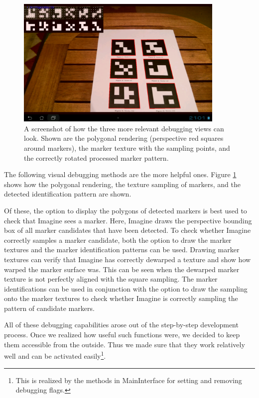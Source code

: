 \begin{figure}
	\centering
	\includegraphics[width=10cm]{img/debugging_view.png}
	\caption[Debugging View]{A screenshot of how the three more relevant debugging views can look. Shown are the polygonal rendering (perspective red squares around markers), the marker texture with the sampling points, and the correctly rotated processed marker pattern.}
	\label{fig:debugging_view}
\end{figure}

The following visual debugging methods are the more helpful ones.
Figure \ref{fig:debugging_view} shows how the polygonal rendering, the texture sampling of markers, and the detected identification pattern are shown.

Of these, the option to display the polygons of detected markers is best used to check that Imagine sees a marker.
Here, Imagine draws the perspective bounding box of all marker candidates that have been detected.
To check whether Imagine correctly samples a marker candidate, both the option to draw the marker textures and the marker identification patterns can be used.
Drawing marker textures can verify that Imagine has correctly dewarped a texture and show how warped the marker surface was.
This can be seen when the dewarped marker texture is not perfectly aligned with the square sampling.
The marker identifications can be used in conjunction with the option to draw the sampling onto the marker textures to check whether Imagine is correctly sampling the pattern of candidate markers.

All of these debugging capabilities arose out of the step-by-step development process.
Once we realized how useful such functions were, we decided to keep them accessible from the outside.
Thus we made sure that they work relatively well and can be activated easily\footnote{This is realized by the methods in MainInterface for setting and removing debugging flags.}.


